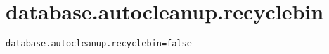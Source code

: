 \section{database.autocleanup.recyclebin}
\label{configuration:DatabaseAutocleanupRecyclebin}
\AvailableInJavaOnly{\TODO}
\begin{lstlisting}[style=Props,caption={Usage example for \textit{database.autocleanup.recyclebin}}]
database.autocleanup.recyclebin=false
\end{lstlisting}